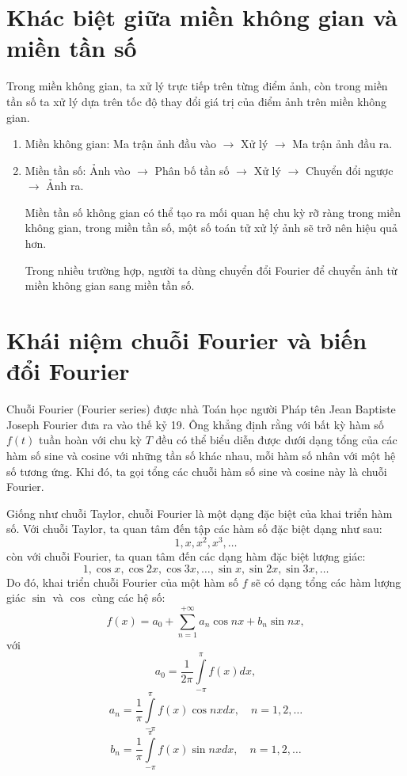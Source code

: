 \documentclass[12pt,a4paper]{report}
\numberwithin{equation}{section}
\theoremstyle{definition} %
\begin{document}
\section{Khác biệt giữa miền không gian và miền tần số}
Trong miền không gian, ta xử lý trực tiếp trên từng điểm ảnh, còn trong miền tần số ta xử lý dựa trên tốc độ thay đổi giá trị của điểm ảnh trên miền không gian.

\begin{enumerate}
    \item Miền không gian: Ma trận ảnh đầu vào $\rightarrow$ Xử lý $\rightarrow$ Ma trận ảnh đầu ra.

    \item Miền tần số: Ảnh vào $\rightarrow$ Phân bố tần số $\rightarrow$ Xử lý $\rightarrow$ Chuyển đổi ngược $\rightarrow$ Ảnh ra.

    Miền tần số không gian có thể tạo ra mối quan hệ chu kỳ rỡ ràng trong miền không gian, trong miền tần số, một số toán tử xử lý ảnh sẽ trở nên hiệu quả hơn.

    Trong nhiều trường hợp, người ta dùng chuyển đổi Fourier để chuyển ảnh từ miền không gian sang miền tần số.
\end{enumerate}
\section{Khái niệm chuỗi Fourier và biến đổi Fourier}

     Chuỗi Fourier (Fourier series) được nhà Toán học người Pháp tên Jean Baptiste Joseph Fourier đưa ra vào thế kỷ 19. Ông khẳng định rằng với bất kỳ hàm số $f(t)$ tuần hoàn với chu kỳ $T$ đều có thể biểu diễn được dưới dạng tổng của các hàm số sine và cosine với những tần số khác nhau, mỗi hàm số nhân với một hệ số tương ứng. Khi đó, ta gọi tổng các chuỗi hàm số sine và cosine này là chuỗi Fourier.

		 Giống như chuỗi Taylor, chuỗi Fourier là một dạng đặc biệt của khai triển hàm số. 
		 Với chuỗi Taylor, ta quan tâm đến tập các hàm số đặc biệt dạng như sau: 
		\begin{equation}
		\tag{a}
		1,x,x^2,x^3,\ldots
		\end{equation}
		 còn với chuỗi Fourier, ta quan tâm đến các dạng hàm đặc biệt lượng giác:
		\begin{equation}
		\tag{b}
		1,\cos x, \cos 2x, \cos 3x,\ldots,\sin x,\sin 2x,\sin 3x,\ldots
		\end{equation}
		Do đó, khai triển chuỗi Fourier của một hàm số $f$ sẽ có dạng tổng các hàm lượng giác $\sin$ và $\cos$ cùng các hệ số:
		\begin{equation}
			\tag{c}
			f(x) = a_0 + \sum_{n=1}^{+\infty}a_n\cos nx + b_n\sin nx,
		\end{equation}
với 
\[a_0 = \dfrac{1}{2\pi}\int\limits_{-\pi}^{\pi}f(x)dx,\]
\[a_n = \dfrac{1}{\pi}\int\limits_{-\pi}^{\pi}f(x)\cos nxdx,\quad n=1,2,\ldots\]
\[b_n = \dfrac{1}{\pi}\int\limits_{-\pi}^{\pi}f(x)\sin nxdx,\quad n=1,2,\ldots\]
\end{document}
